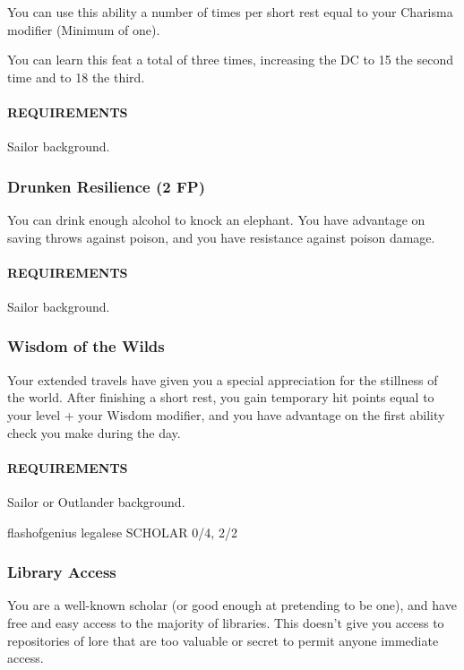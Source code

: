         You can use this ability a number of times per short rest equal to your Charisma modifier (Minimum of one).

        You can learn this feat a total of three times, increasing the DC to 15 the second time and to 18 the third.
        \paragraph{REQUIREMENTS} Sailor background.

    \subsubsection{Drunken Resilience (2 FP)} \label{feat::drunkenresilience}
        You can drink enough alcohol to knock an elephant.
        You have advantage on saving throws against poison, and you have resistance against poison damage.
        \paragraph{REQUIREMENTS} Sailor background.

    \subsubsection{Wisdom of the Wilds} \label{feat::wisdomofthewilds}
        Your extended travels have given you a special appreciation for the stillness of the world.
        After finishing a short rest, you gain temporary hit points equal to your level + your Wisdom modifier, and you have advantage on the first ability check you make during the day.
        \paragraph{REQUIREMENTS} Sailor or Outlander background.

flashofgenius legalese
SCHOLAR 0/4, 2/2
    \subsubsection{Library Access} \label{feat::libraryaccess}
        You are a well-known scholar (or good enough at pretending to be one), and have free and easy access to the majority of libraries.
        This doesn't give you access to repositories of lore that are too valuable or secret to permit anyone immediate access.

